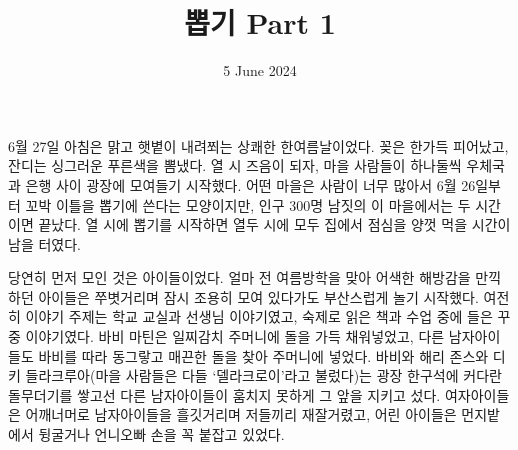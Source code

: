 \documentclass{translation}
\date{5 June 2024}
\title{뽑기 Part 1}
\begin{document}
6월 27일 아침은 맑고 햇볕이 내려쬐는 상쾌한 한여름날이었다.
꽂은 한가득 피어났고, 잔디는 싱그러운 푸른색을 뽐냈다.
열 시 즈음이 되자, 마을 사람들이 하나둘씩 우체국과 은행 사이 광장에 모여들기 시작했다.
어떤 마을은 사람이 너무 많아서 6월 26일부터 꼬박 이틀을 뽑기에 쓴다는 모양이지만, 인구 300명 남짓의 이 마을에서는 두 시간이면 끝났다.
열 시에 뽑기를 시작하면 열두 시에 모두 집에서 점심을 양껏 먹을 시간이 남을 터였다.
% 

당연히 먼저 모인 것은 아이들이었다.
얼마 전 여름방학을 맞아 어색한 해방감을 만끽하던 아이들은 쭈볏거리며 잠시 조용히 모여 있다가도 부산스럽게 놀기 시작했다.
여전히 이야기 주제는 학교 교실과 선생님 이야기였고, 숙제로 읽은 책과 수업 중에 들은 꾸중 이야기였다.
바비 마틴은 일찌감치 주머니에 돌을 가득 채워넣었고, 다른 남자아이들도 바비를 따라 동그랗고 매끈한 돌을 찾아 주머니에 넣었다.
바비와 해리 존스와 디키 들라크루아(마을 사람들은 다들 `델라크로이'라고 불렀다)는 광장 한구석에 커다란 돌무더기를 쌓고선 다른 남자아이들이 훔치지 못하게 그 앞을 지키고 섰다.
여자아이들은 어깨너머로 남자아이들을 흘깃거리며 저들끼리 재잘거렸고, 어린 아이들은 먼지밭에서 뒹굴거나 언니오빠 손을 꼭 붙잡고 있었다.
% 
\end{document}
